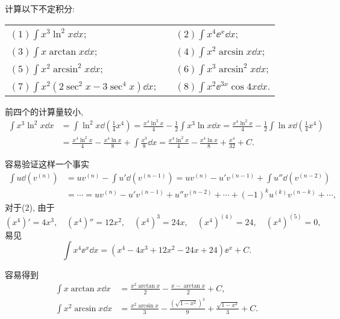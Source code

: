 \begin{quiza}
\woe 计算以下不定积分:\vspace{8pt}\\
\begin{tabular}{lcl}
\((1)\int x^3\ln^2x\dd x\);&\qquad\qquad\qquad&\((2)\int x^4\ee^x\dd x\);\vspace{0.3cm}\\
\((3)\int x\arctan x\dd x\);&&\((4)\int x^2\arcsin x\dd x\);\vspace{0.3cm}\\
\((5)\int x^2\arcsin^2x\dd x\);&&\((6)\int x^3\arcsin^2x\dd x\);\vspace{0.3cm}\\
\((7)\int x^2\left(2\sec^2x-3\sec^4x\right)\dd x\);&&\((8)\int x^2\ee^{3x}\cos 4x\dd x\).\vspace{0.3cm}\\
\end{tabular}
\begin{solution}
前四个的计算量较小, \[\begin{split}
\int x^3\ln^2x\dd x&=\int\ln^2x\dd\left(\frac{1}{4}x^4\right)=\frac{x^4\ln^2x}{4}-\frac{1}{2}\int x^3\ln x\dd x=\frac{x^4\ln^2x}{4}-\frac{1}{2}\int\ln x\dd\left(\frac{1}{4}x^4\right)\\&=\frac{x^4\ln^2x}{4}-\frac{x^4\ln x}{8}+\int\frac{x^3}{8}\dd x=\frac{x^4\ln^2x}{4}-\frac{x^4\ln x}{8}+\frac{x^4}{32}+C.\end{split}\]

容易验证这样一个事实\[\begin{split}
\int u\dd \left(v^{(n)}\right)&=uv^{(n)}-\int u'\dd\left(v^{(n-1)}\right)=uv^{(n)}-u'v^{(n-1)}+\int u''\dd\left(v^{(n-2)}\right)\\&=\cdots=uv^{(n)}-u'v^{(n-1)}+u''v^{(n-2)}+\cdots+(-1)^ku^{(k)}v^{(n-k)}+\cdots,
\end{split}\]对于(2), 由于\[\left(x^4\right)'=4x^3,\quad\left(x^4\right)''=12x^2,\quad\left(x^4\right)^{3}=24x,\quad\left(x^4\right)^{(4)}=24,\quad\left(x^4\right)^{(5)}=0,\]易见\[\int x^4\ee^x\dd x=\left(x^4-4x^3+12x^2-24x+24\right)\ee^x+C.\]

容易得到
\[\begin{split}
\int x\arctan x\dd x&=\frac{x^2\arctan x}{2}-\frac{x-\arctan x}{2}+C,\\
\int x^2\arcsin x\dd x&=\frac{x^2\arcsin x}{3}-\frac{\left(\sqrt{1-x^2}\right)^3}{9}+\frac{\sqrt{1-x^2}}{3}+C.
\end{split}\]


\end{solution}
\end{quiza}
